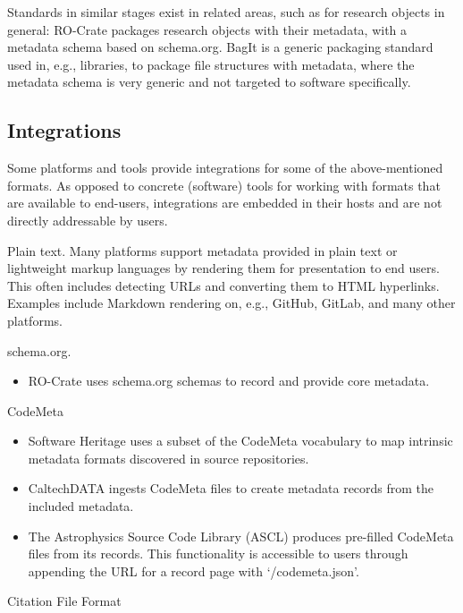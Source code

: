 \documentclass{article}
\begin{document}
Standards in similar stages exist in related areas, such as for research objects in general: RO-Crate \cite{138880/S5F3HZ96} packages research objects with their metadata, with a metadata schema based on schema.org. BagIt \cite{138880/CE9VUDMM} is a generic packaging standard used in, e.g., libraries, to package file structures with metadata, where the metadata schema is very generic and not targeted to software specifically.



\subsection{Integrations}\label{subsec:metadata-integrations}
Some platforms and tools provide integrations for some of the above-mentioned formats. As opposed to concrete (software) tools for working with formats that are available to end-users, integrations are embedded in their hosts and are not directly addressable by users.

Plain text. Many platforms support metadata provided in plain text or lightweight markup languages by rendering them for presentation to end users. This often includes detecting URLs and converting them to HTML hyperlinks. Examples include Markdown rendering on, e.g., GitHub, GitLab, and many other platforms.

schema.org.

\begin{itemize}  
\item  RO-Crate uses schema.org schemas to record and provide core metadata.


\end{itemize}CodeMeta 

\begin{itemize}  
\item Software Heritage uses a subset of the CodeMeta vocabulary to map intrinsic metadata formats discovered in source repositories.


\item CaltechDATA ingests CodeMeta files to create metadata records from the included metadata.


\item The Astrophysics Source Code Library (ASCL) produces pre-filled CodeMeta files from its records. This functionality is accessible to users through appending the URL for a record page with ‘/codemeta.json’.


\end{itemize}Citation File Format 
\end{document}
